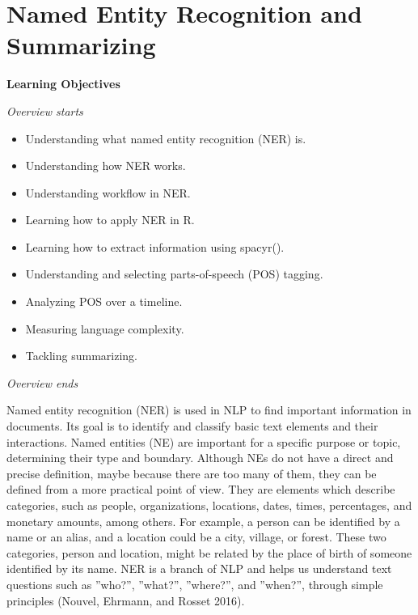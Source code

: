 \chapter{Named Entity Recognition and
Summarizing}\label{sec-named-entity-recognition-and-summarization}

\textbf{Learning Objectives}

\emph{Overview starts}

\begin{itemize}
\tightlist
\item
  Understanding what named entity recognition (NER) is.
\item
  Understanding how NER works.
\item
  Understanding workflow in NER.
\item
  Learning how to apply NER in R.
\item
  Learning how to extract information using spacyr().
\item
  Understanding and selecting parts-of-speech (POS) tagging.
\item
  Analyzing POS over a timeline.
\item
  Measuring language complexity.
\item
  Tackling summarizing.
\end{itemize}

\emph{Overview ends}

Named entity recognition (NER) is used in NLP to find important
information in documents. Its goal is to identify and classify basic
text elements and their interactions. Named entities (NE) are important
for a specific purpose or topic, determining their type and boundary.
Although NEs do not have a direct and precise definition, maybe because
there are too many of them, they can be defined from a more practical point of
view. They are elements which describe categories, such as people,
organizations, locations, dates, times, percentages, and monetary
amounts, among others. For example, a person can be identified by a name
or an alias, and a location could be a city, village, or forest. These
two categories, person and location, might be related by the place of
birth of someone identified by its name. NER is a branch of NLP and helps us understand text questions such as ''who?'', ''what?'', ''where?'', and ''when?'',
through simple principles (Nouvel, Ehrmann, and Rosset 2016).

